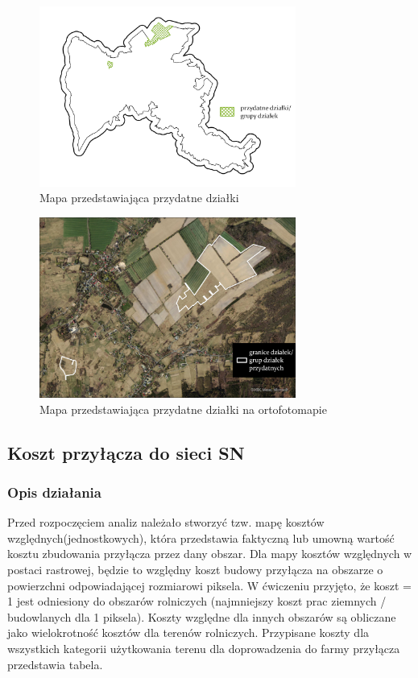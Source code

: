 \documentclass{article}
\begin{document}
\begin{figure}[H]
    \centering
    \includegraphics[width=0.75\textwidth]{img/przydatne-dzialki.jpg}
    \caption*{Mapa przedstawiająca przydatne działki}
\end{figure}

\begin{figure}[H]
    \centering
    \includegraphics[width=0.75\textwidth]{img/dzialki-przydatne-ortofoto.jpg}
    \caption*{Mapa przedstawiająca przydatne działki na ortofotomapie}
\end{figure}

\subsection{Koszt przyłącza do sieci SN}
\subsubsection{Opis działania}
Przed rozpoczęciem analiz należało stworzyć tzw. mapę kosztów względnych(jednostkowych), która przedstawia faktyczną lub umowną wartość kosztu zbudowania
przyłącza przez dany obszar. Dla mapy kosztów względnych w postaci rastrowej, będzie to względny koszt budowy przyłącza na obszarze o powierzchni odpowiadającej rozmiarowi
piksela. W ćwiczeniu przyjęto, że koszt = 1 jest odniesiony do obszarów rolniczych (najmniejszy koszt prac ziemnych / budowlanych dla 1 piksela). Koszty względne dla innych obszarów są obliczane jako wielokrotność kosztów dla terenów rolniczych. Przypisane koszty dla wszystkich kategorii użytkowania terenu dla doprowadzenia do
farmy przyłącza przedstawia tabela.
\end{document}
